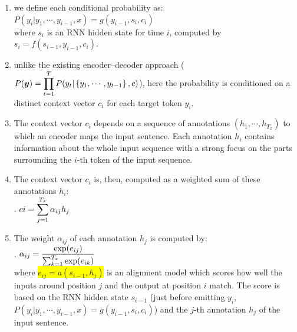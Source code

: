 \begin{enumerate}
    \item we define each conditional probability as:
    $ P(y_i|y_1, \cdots , y_{i-1}, x) = g(y_{i-1}, s_i, c_i) $
    \hfill \cite{arxiv/1409.0473/NMT-Jointly-Learning-Align-Translate}
    \\[0.2cm]
    where $s_i$ is an RNN hidden state for time $i$, computed by 
    $s_i = f (s_{i-1}, y_{i-1}, c_i)$.
    \hfill \cite{arxiv/1409.0473/NMT-Jointly-Learning-Align-Translate}

    \item unlike the existing encoder–decoder approach ($P(\bm{y}) = \displaystyle\prod_{t=1}^T P(y_t | \left\{y_1, \cdots , y_{t-1}\right\} , c)$), here the probability is conditioned on a distinct context vector $c_i$ for each target token $y_i$.
    \hfill \cite{arxiv/1409.0473/NMT-Jointly-Learning-Align-Translate}

    \item The context vector $c_i$ depends on a sequence of annotations $(h_1, \cdots , h_{T_x} )$ to which an encoder maps the input sentence. 
    Each annotation $h_i$ contains information about the whole input sequence with a strong focus on the parts surrounding the $i$-th token of the input sequence. 
    \hfill \cite{arxiv/1409.0473/NMT-Jointly-Learning-Align-Translate}

    \item The context vector $c_i$ is, then, computed as a weighted sum of these annotations $h_i$:
    \hfill \cite{arxiv/1409.0473/NMT-Jointly-Learning-Align-Translate}
    \\[0.2cm]
    .\hfill
    $ ci = \displaystyle\sum_{j=1}^{T_x} \alpha_{ij} h_j  $
    \hfill \cite{arxiv/1409.0473/NMT-Jointly-Learning-Align-Translate}

    \item The weight $\alpha_{ij}$ of each annotation $h_j$ is computed by:
    \hfill \cite{arxiv/1409.0473/NMT-Jointly-Learning-Align-Translate}
    \\[0.2cm]
    .\hfill
    $ \alpha_{ij}  =\dfrac{\exp (e_{ij} )}{\textstyle\sum_{k=1}^{T_x} \exp (e_{ik}) } $
    \hfill \cite{arxiv/1409.0473/NMT-Jointly-Learning-Align-Translate}
    \\[0.2cm]
    where \colorbox{yellow}{$e_{ij} = a(s_{i-1}, h_j )$} is an alignment model which scores how well the inputs around position $j$ and the output at position $i$ match. 
    The score is based on the RNN hidden state $s_{i-1}$ (just before emitting $y_i$, $ P(y_i|y_1, \cdots , y_{i-1}, x) = g(y_{i-1}, s_i, c_i) $) and the $j$-th annotation $h_j$ of the input sentence.
    \hfill \cite{arxiv/1409.0473/NMT-Jointly-Learning-Align-Translate}


\end{enumerate}
